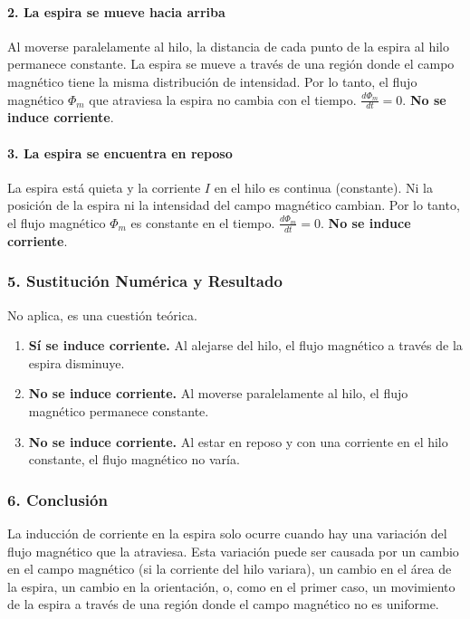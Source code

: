 \paragraph*{2. La espira se mueve hacia arriba}
Al moverse paralelamente al hilo, la distancia de cada punto de la espira al hilo permanece constante. La espira se mueve a través de una región donde el campo magnético tiene la misma distribución de intensidad. Por lo tanto, el flujo magnético $\Phi_m$ que atraviesa la espira no cambia con el tiempo. $\frac{d\Phi_m}{dt} = 0$. \textbf{No se induce corriente}.

\paragraph*{3. La espira se encuentra en reposo}
La espira está quieta y la corriente $I$ en el hilo es continua (constante). Ni la posición de la espira ni la intensidad del campo magnético cambian. Por lo tanto, el flujo magnético $\Phi_m$ es constante en el tiempo. $\frac{d\Phi_m}{dt} = 0$. \textbf{No se induce corriente}.

\subsubsection*{5. Sustitución Numérica y Resultado}
No aplica, es una cuestión teórica.
\begin{cajaresultado}
\begin{enumerate}
    \item \textbf{Sí se induce corriente.} Al alejarse del hilo, el flujo magnético a través de la espira disminuye.
    \item \textbf{No se induce corriente.} Al moverse paralelamente al hilo, el flujo magnético permanece constante.
    \item \textbf{No se induce corriente.} Al estar en reposo y con una corriente en el hilo constante, el flujo magnético no varía.
\end{enumerate}
\end{cajaresultado}

\subsubsection*{6. Conclusión}
\begin{cajaconclusion}
La inducción de corriente en la espira solo ocurre cuando hay una variación del flujo magnético que la atraviesa. Esta variación puede ser causada por un cambio en el campo magnético (si la corriente del hilo variara), un cambio en el área de la espira, un cambio en la orientación, o, como en el primer caso, un movimiento de la espira a través de una región donde el campo magnético no es uniforme.
\end{cajaconclusion}

